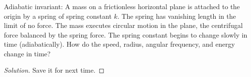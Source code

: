 \begin{problem}
	Adiabatic invariant: A mass on a frictionless horizontal plane is attached to the origin by a spring of spring constant $k$. The spring has vanishing length in the limit of no force. The mass executes circular motion in the plane, the centrifugal force balanced by the spring force. The spring constant begins to change slowly in time (adiabatically). How do the speed, radius, angular frequency, and energy change in time?
\end{problem}
\begin{proof}[Solution]
	Save it for next time.
\end{proof}



